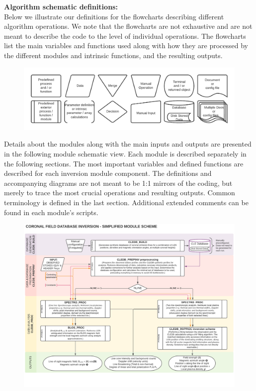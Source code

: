 \documentclass{article}
\begin{document}
\textbf{Algorithm schematic definitions:\\} 
Below we illustrate our definitions for the flowcharts describing different algorithm operations. We note that the flowcharts are not exhaustive and are not meant to describe the code to the level of individual operations. The flowcharts list the main variables and functions used along with how they are processed by the different modules and intrinsic functions, and the resulting outputs. 



\begin{figure}[!h]
 \hspace{-0.8cm}\includegraphics[width=1.08\columnwidth]{figs/shape_defs.pdf}
\end{figure} 

 Details about the modules along with the main inputs and outputs are presented in the following module schematic view. Each module is described separately in the following sections. The most important variables and defined functions are described for each inversion module component. The definitions and accompanying diagrams are not meant to be 1:1 mirrors of the coding, but merely to trace the most crucial operations and resulting outputs. Common terminology is defined in the last section. Additional extended comments can be found in each module's scripts.

\begin{figure}[!p]
\vspace{-1cm}\hspace{-2cm}\includegraphics[angle=-90,width=1.1\columnwidth]{figs/1_CLEDB_OVERVIEW.pdf}
\end{figure} 
\end{document}
